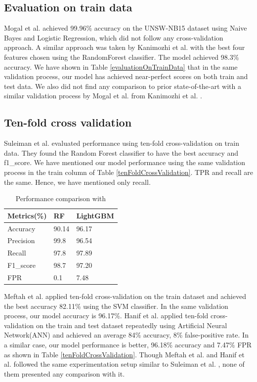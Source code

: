 \documentclass[14pt, conference]{IEEEtran}
\begin{document}
\subsection{Evaluation on train data}
Mogal et al. \cite{mogal2017nids} achieved 99.96\% accuracy on the UNSW-NB15 dataset using Naive Bayes and Logistic Regression,
which did not follow any cross-validation approach. A similar approach was taken by Kanimozhi et al. \cite{Kanimozhi2019UNSW-NB15} with the best four features chosen using the RandomForest classifier. The model achieved 98.3\% accuracy. We have shown in Table \ref{evaluationOnTrainData} that in the same validation process, our model has achieved near-perfect scores on both train and test data. We also did not find any comparison to
prior state-of-the-art with a similar validation process by Mogal et al. \cite{mogal2017nids} from Kanimozhi et al. \cite{Kanimozhi2019UNSW-NB15}.


\subsection{Ten-fold cross validation}
Suleiman et al.\cite{suleiman2018performance} evaluated performance using ten-fold cross-validation on train data. They found the Random Forest classifier to have the best accuracy and f1\_score. We have mentioned our model performance
using the same validation process in the train column of Table \ref{tenFoldCrossValidation}. TPR and recall are the same. Hence, we have mentioned only recall.


\begin{table}
\normalsize
\centering
\caption{Performance comparison with \cite{suleiman2018performance}}
\label{performanceComparisonWithSuleiman}
\renewcommand{\arraystretch}{1.2}
\begin{tabular}{|C{2.3cm}|C{2.2cm}|C{2.2cm}|}
\hline
\textbf{Metrics(\%)} & \textbf{RF \cite{suleiman2018performance}} & \textbf{LightGBM} \\ \hline
Accuracy & 90.14 & 96.17\\ \hline
Precision  & 99.8 & 96.54\\ \hline
Recall  & 97.8 & 97.89\\ \hline
F1\_score  & 98.7 & 97.20\\ \hline
FPR  & 0.1 & 7.48\\ \hline
\end{tabular}
\end{table}

Meftah et al. \cite{meftah2019network} applied ten-fold cross-validation on the train dataset and achieved the best accuracy 82.11\% using the SVM classifier. In the same validation process, our model accuracy is 96.17\%. Hanif et al. \cite{hanif2019intrusion} applied ten-fold cross-validation on the train and test dataset repeatedly using Artificial Neural Network(ANN) and achieved an average 84\% accuracy, 8\% false-positive rate. In a similar case, our model performance is better, 96.18\% accuracy and 7.47\% FPR as shown in Table \ref{tenFoldCrossValidation}. Though Meftah et al. \cite{meftah2019network} and Hanif et al. \cite{hanif2019intrusion} followed the same experimentation setup similar to Suleiman et al. \cite{suleiman2018performance}, none of them presented any comparison with it.
\end{document}
